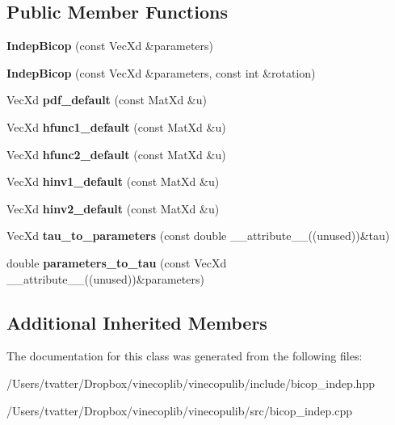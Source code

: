 \subsection*{Public Member Functions}
\begin{DoxyCompactItemize}
\item 
\mbox{\label{class_indep_bicop_ab9f48d3291ac99c34e33c2f29b133e5d}} 
{\bfseries Indep\+Bicop} (const Vec\+Xd \&parameters)
\item 
\mbox{\label{class_indep_bicop_ad7ead44250e4f421ec491b2d2a7eb030}} 
{\bfseries Indep\+Bicop} (const Vec\+Xd \&parameters, const int \&rotation)
\item 
\mbox{\label{class_indep_bicop_a533aeb27876d38d9836929a71b9bb223}} 
Vec\+Xd {\bfseries pdf\+\_\+default} (const Mat\+Xd \&u)
\item 
\mbox{\label{class_indep_bicop_abac716dd22bc020d073d50dfc552c00e}} 
Vec\+Xd {\bfseries hfunc1\+\_\+default} (const Mat\+Xd \&u)
\item 
\mbox{\label{class_indep_bicop_ae054353b15c15d68a02b36a804e54dfa}} 
Vec\+Xd {\bfseries hfunc2\+\_\+default} (const Mat\+Xd \&u)
\item 
\mbox{\label{class_indep_bicop_a61e64923f5b5a142d093c5b706893b93}} 
Vec\+Xd {\bfseries hinv1\+\_\+default} (const Mat\+Xd \&u)
\item 
\mbox{\label{class_indep_bicop_a426311d78e6142d6f57e5a09080f9239}} 
Vec\+Xd {\bfseries hinv2\+\_\+default} (const Mat\+Xd \&u)
\item 
\mbox{\label{class_indep_bicop_aad75f32c212384b14eb18f814624ac2d}} 
Vec\+Xd {\bfseries tau\+\_\+to\+\_\+parameters} (const double \+\_\+\+\_\+attribute\+\_\+\+\_\+((unused))\&tau)
\item 
\mbox{\label{class_indep_bicop_aa59b7dd7c626448fb18c35b501aff554}} 
double {\bfseries parameters\+\_\+to\+\_\+tau} (const Vec\+Xd \+\_\+\+\_\+attribute\+\_\+\+\_\+((unused))\&parameters)
\end{DoxyCompactItemize}
\subsection*{Additional Inherited Members}


The documentation for this class was generated from the following files\+:\begin{DoxyCompactItemize}
\item 
/\+Users/tvatter/\+Dropbox/vinecoplib/vinecopulib/include/bicop\+\_\+indep.\+hpp\item 
/\+Users/tvatter/\+Dropbox/vinecoplib/vinecopulib/src/bicop\+\_\+indep.\+cpp\end{DoxyCompactItemize}
